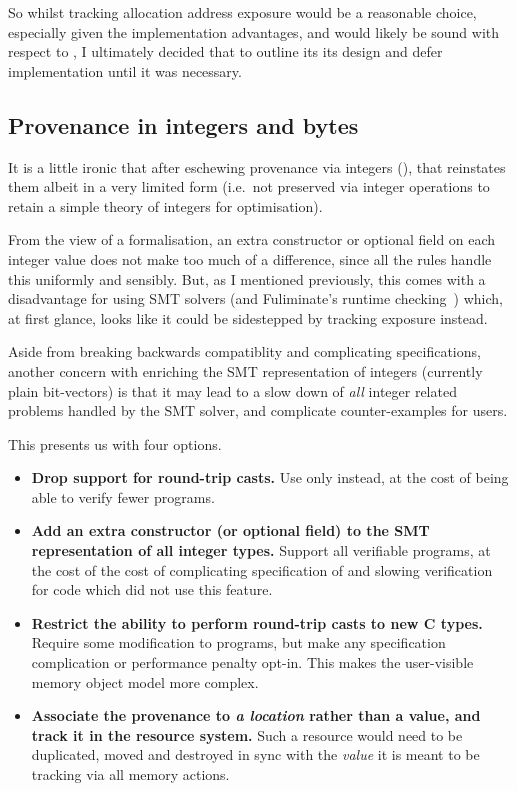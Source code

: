 So whilst tracking allocation address exposure would be a reasonable choice,
especially given the implementation advantages, and would likely be sound with
respect to , I ultimately decided that to outline its
its design and defer implementation until it was necessary.

\subsection{Provenance in integers and bytes}\label{subsec:prov-int-bytes}

It is a little ironic that after eschewing provenance via integers (),
that  reinstates them albeit in a very limited form (i.e.\ not preserved
via integer operations to retain a simple theory of integers for optimisation).

From the view of a formalisation, an extra constructor or optional field on
each integer value does not make too much of a difference, since all the rules
handle this uniformly and sensibly. But, as I mentioned previously, this comes
with a disadvantage for using SMT solvers (and Fuliminate's runtime
checking~\cite{banerjee2025fulminate}) which, at first glance, looks like it
could be sidestepped by tracking exposure instead.

Aside from breaking backwards compatiblity and complicating specifications,
another concern with enriching the SMT representation of integers (currently
plain bit-vectors) is that it may lead to a slow down of \emph{all} integer
related problems handled by the SMT solver, and complicate counter-examples for
users.

This presents us with four options.
\begin{itemize}
    \item \textbf{Drop support for round-trip casts.} Use only
         instead, at the cost of being able
        to verify fewer programs.
    \item \textbf{Add an extra constructor (or optional field) to the SMT
        representation of all integer types.} Support all  verifiable
        programs, at the cost of the cost of complicating specification of
        and slowing verification for code which did not use this feature.
    \item \textbf{Restrict the ability to perform round-trip casts to new C
        types.} Require some modification to  programs, but
        make any specification complication or performance penalty opt-in. This
        makes the user-visible memory object model more complex.\label{sn:optin-typedef}
    \item \textbf{Associate the provenance to \emph{a location} rather than a
        value, and track it in the resource system.} Such a resource would need
        to be duplicated, moved and destroyed in sync with the \emph{value} it
        is meant to be tracking via all memory actions.
\end{itemize}

